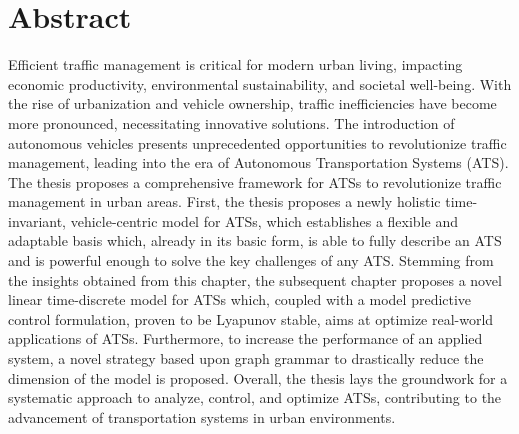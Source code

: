 \chapter*{Abstract}
Efficient traffic management is critical for modern urban living, impacting economic productivity, environmental sustainability, and societal well-being. With the rise of urbanization and vehicle ownership, traffic inefficiencies have become more pronounced, necessitating innovative solutions. The introduction of autonomous vehicles presents unprecedented opportunities to revolutionize traffic management, leading into the era of Autonomous Transportation Systems (ATS). The thesis proposes a comprehensive framework for ATSs to revolutionize traffic management in urban areas. First, the thesis proposes a newly holistic time-invariant, vehicle-centric model for ATSs, which establishes a flexible and adaptable basis which, already in its basic form, is able to fully describe an ATS and is powerful enough to solve the key challenges of any ATS. Stemming from the insights obtained from this chapter, the subsequent chapter proposes a novel linear time-discrete model for ATSs which, coupled with a model predictive control formulation, proven to be Lyapunov stable, aims at optimize real-world applications of ATSs. Furthermore, to increase the performance of an applied system, a novel strategy based upon graph grammar to drastically reduce the dimension of the model is proposed. Overall, the thesis lays the groundwork for a systematic approach to analyze, control, and optimize ATSs, contributing to the advancement of transportation systems in urban environments.
